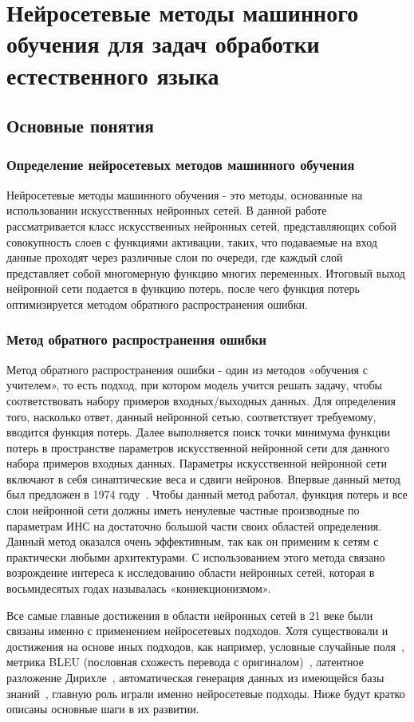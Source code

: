\chapter{Нейросетевые методы машинного обучения для задач обработки естественного языка}\label{ch:nn} 
  
\section{Основные понятия}
\subsection{Определение нейросетевых методов машинного обучения}
Нейросетевые методы машинного обучения - это методы, основанные на использовании искусственных нейронных сетей. В данной работе рассматривается класс искусственных нейронных сетей, представляющих собой совокупность слоев с функциями активации, таких, что подаваемые на вход данные проходят через различные слои по очереди, где каждый слой представляет собой многомерную функцию многих переменных. Итоговый выход нейронной сети подается в функцию потерь, после чего функция потерь оптимизируется методом обратного распространения ошибки. 
\subsection{Метод обратного распространения ошибки}
Метод обратного распространения ошибки - один из методов «обучения с учителем», то есть подход, при котором модель учится решать задачу, чтобы соответствовать набору примеров входных/выходных данных. Для определения того, насколько ответ, данный нейронной сетью, соответствует требуемому, вводится функция потерь. Далее выполняется поиск точки минимума функции потерь в пространстве параметров искусственной нейронной сети для данного набора примеров входных данных. Параметры искусственной нейронной сети включают в себя синаптические веса и сдвиги нейронов. Впервые данный метод был предложен в 1974 году~\cite{werbos_1974}. Чтобы данный метод работал, функция потерь и все слои нейронной сети должны иметь ненулевые частные производные по параметрам ИНС на достаточно большой части своих областей определения.
Данный метод оказался очень эффективным, так как он применим к сетям с практически любыми архитектурами. С использованием этого метода связано возрождение интереса к исследованию области нейронных сетей, которая в восьмидесятых годах называлась «коннекционизмом». 

Все самые главные достижения в области нейронных сетей в 21 веке были связаны именно с применением нейросетевых подходов. Хотя существовали и достижения на основе иных подходов, как например, условные случайные поля~\cite{lafferty_2004}, метрика BLEU (пословная схожесть перевода с оригиналом)~\cite{papineni_2001}, латентное разложение Дирихле~\cite{blei_2003}, автоматическая генерация данных из имеющейся базы знаний~\cite{mintz_2009}, главную роль играли именно нейросетевые подходы. Ниже будут кратко описаны основные шаги в их развитии.

